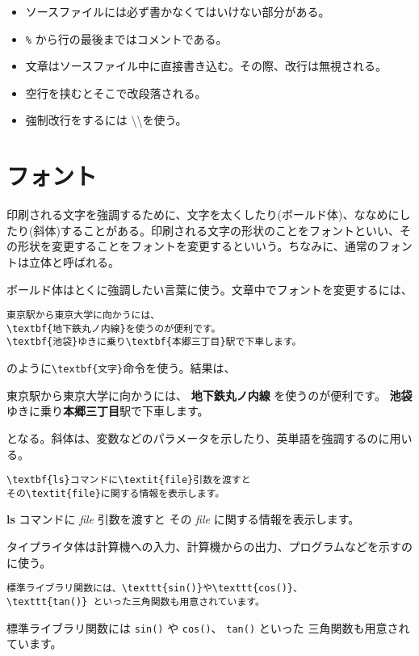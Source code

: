 \begin{itemize}
    \item ソースファイルには必ず書かなくてはいけない部分がある。
    \item \texttt{\%} から行の最後まではコメントである。
    \item 文章はソースファイル中に直接書き込む。その際、改行は無視される。
    \item 空行を挟むとそこで改段落される。
    \item 強制改行をするには \textbackslash \textbackslash を使う。
\end{itemize}



\section{フォント}
\label{sec:latex:font}

印刷される文字を強調するために、文字を太くしたり(ボールド体)、ななめにしたり(斜体)することがある。印刷される文字の形状のことをフォントといい、その形状を変更することをフォントを変更するといいう。ちなみに、通常のフォントは立体と呼ばれる。

ボールド体はとくに強調したい言葉に使う。文章中でフォントを変更するには、
\begin{reidai}
    \begin{verbatim}
東京駅から東京大学に向かうには、
\textbf{地下鉄丸ノ内線}を使うのが便利です。
\textbf{池袋}ゆきに乗り\textbf{本郷三丁目}駅で下車します。
\end{verbatim}
\end{reidai} \noindent
のように\verb|\textbf{文字}|命令を使う。結果は、
\begin{kekka}
    東京駅から東京大学に向かうには、
    \textbf{地下鉄丸ノ内線} を使うのが便利です。
    \textbf{池袋}ゆきに乗り\textbf{本郷三丁目}駅で下車します。
\end{kekka} \noindent
となる。斜体は、変数などのパラメータを示したり、英単語を強調するのに用いる。
\begin{reidai}
    \begin{verbatim}
\textbf{ls}コマンドに\textit{file}引数を渡すと
その\textit{file}に関する情報を表示します。
\end{verbatim}
\end{reidai}
\vspace*{-1.5em}
\begin{kekka}
    \textbf{ls} コマンドに \textit{file} 引数を渡すと
    その \textit{file} に関する情報を表示します。
\end{kekka} \noindent
タイプライタ体は計算機への入力、計算機からの出力、プログラムなどを示すのに使う。
\begin{reidai}
    \begin{verbatim}
標準ライブラリ関数には、\texttt{sin()}や\texttt{cos()}、
\texttt{tan()} といった三角関数も用意されています。
\end{verbatim}
\end{reidai}
\vspace*{-1.5em}
\begin{kekka}
    標準ライブラリ関数には \texttt{sin()} や \texttt{cos()}、
    \texttt{tan()} といった
    三角関数も用意されています。
\end{kekka}

